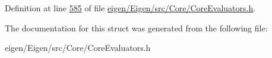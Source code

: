 Definition at line \hyperlink{eigen_2_eigen_2src_2_core_2_core_evaluators_8h_source_l00585}{585} of file \hyperlink{eigen_2_eigen_2src_2_core_2_core_evaluators_8h_source}{eigen/\+Eigen/src/\+Core/\+Core\+Evaluators.\+h}.



The documentation for this struct was generated from the following file\+:\begin{DoxyCompactItemize}
\item 
eigen/\+Eigen/src/\+Core/\+Core\+Evaluators.\+h\end{DoxyCompactItemize}

